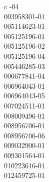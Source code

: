 \begin{deluxetable}{c}
\tablewidth{\linewidth}
-04\\
003958301-01\\
005114623-01\\
005125196-01\\
005125196-02\\
005125196-04\\
005446285-03\\
006677841-04\\
006964043-01\\
006964043-05\\
007024511-01\\
008009496-01\\
008956706-01\\
008956706-06\\
009032900-01\\
009301564-01\\
010223616-01\\
012459725-01
\enddata

\end{deluxetable}



